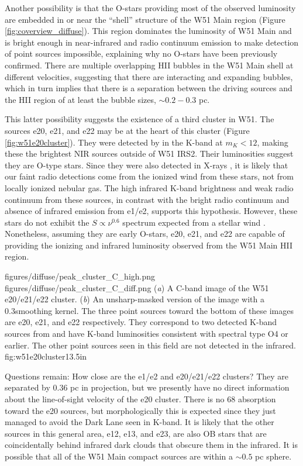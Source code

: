Another possibility is that the O-stars providing most of the observed
luminosity are embedded in or near the ``shell'' structure of the W51 Main
region (Figure \ref{fig:coverview_diffuse}).  This region dominates the
luminosity of W51 Main and is bright enough in near-infrared and radio
continuum emission to make detection of point sources impossible, explaining
why no O-stars have been previously confirmed.  There are multiple overlapping
HII bubbles in the W51 Main shell at different velocities, suggesting that
there are interacting and  expanding bubbles, which in turn implies that there
is a separation between the driving sources and the HII region of at least the
bubble sizes, $\sim0.2-0.3$ pc.  

This latter possibility suggests the existence of a third cluster in W51.  The
sources e20, e21, and e22 may be at the heart of this cluster (Figure
\ref{fig:w51e20cluster}).  They
were detected by \citet{Goldader1994a} in the K-band at $m_K < 12$, making
these the brightest NIR sources outside of W51 IRS2.  Their luminosities
suggest they are O-type stars.  Since they were also detected
in X-rays \citep{Townsley2014a}, it is likely that our faint radio detections
come from the ionized wind from these stars, not from locally ionized nebular gas.
The high infrared K-band brightness and weak radio continuum from these sources,
in contrast with the bright radio continuum and absence of infrared emission
from e1/e2, supports this hypothesis.  However, these stars do not exhibit
the $S\propto \nu^{0.6}$ spectrum expected from a stellar wind
\citep{Wright1975a,Panagia1975b,Reynolds1986a}.
Nonetheless, assuming they are early O-stars, e20, e21, and e22 are capable of
providing the ionizing and infrared luminosity observed from the W51 Main HII
region.

\FigureTwo
{figures/diffuse/peak_cluster_C_high.png}
{figures/diffuse/peak_cluster_C_diff.png}
{({\it a}) A C-band image of the W51 e20/e21/e22 cluster.
({\it b}) An unsharp-masked version of the image with a 0.3\arcsec smoothing
kernel. 
The three point sources toward the bottom of these images are e20, e21, and e22
respectively.  They correspond to two detected K-band sources from
\citet{Goldader1994a} and have K-band luminosities consistent with spectral
type O4 or earlier.  The other point sources seen in this field are not detected
in the infrared.
}
{fig:w51e20cluster}{1}{3.5in}


Questions remain: %
How close are the e1/e2 and e20/e21/e22 clusters?  They are
separated by 0.36 pc in projection, but we presently have no direct information
about the line-of-sight velocity of the e20 cluster.  There is no 68 \kms
\formaldehyde absorption toward the e20 sources, but morphologically this is
expected since they just managed to avoid the Dark Lane seen in K-band.  It is
likely that the other sources in this general area, e12, e13, and e23, are also
OB stars that are coincidentally behind infrared dark clouds that obscure them
in the infrared.  It is possible that all of the W51 Main compact sources are
within a $\sim 0.5$ pc sphere.

